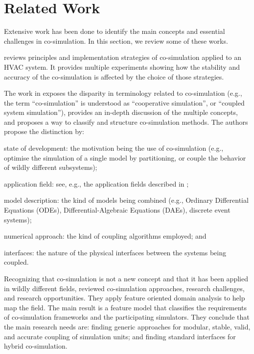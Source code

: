 
\section{Related Work}\label{sec:related}

Extensive work has been done to identify the main concepts and essential challenges in co-simulation.
In this section, we review some of these works.

\cite{Trcka2007} reviews principles and implementation strategies of co-simulation applied to an HVAC system.
It provides multiple experiments showing how the stability and accuracy of the co-simulation is affected by the choice of those strategies.

The work in \cite{Hafner2017} exposes the disparity in terminology related to co-simulation (e.g., the term ``co-simulation'' is understood as ``cooperative simulation'', or ``coupled system simulation''), provides an in-depth discussion of the multiple concepts, and proposes a way to classify and structure co-simulation methods.
The authors propose the distinction by:
\begin{compactdesc}
\item[state of development:] the motivation being the use of co-simulation (e.g., optimise the simulation of a single model by partitioning, or couple the behavior of wildly different subsystems);
\item[application field:] see, e.g., the application fields described in \cite{Gomes2017};
\item[model description:]  the kind of models being combined (e.g., Ordinary Differential Equations (ODEs), Differential-Algebraic Equations (DAEs), discrete event systems);
\item[numerical approach:] the kind of coupling algorithms employed; and
\item[interfaces:]  the nature of the physical interfaces between the systems being coupled.
\end{compactdesc}

Recognizing that co-simulation is not a new concept and that it has been applied in wildly different fields, \cite{Gomes2018} reviewed co-simulation approaches, research challenges, and research opportunities. 
They apply feature oriented domain analysis \cite{Kang1990} to help map the field. 
The main result is a feature model that classifies the requirements of co-simulation frameworks and the participating simulators. 
They conclude that the main research needs are: finding generic approaches for modular, stable, valid, and accurate coupling of simulation units; and finding standard interfaces for hybrid co-simulation. 

